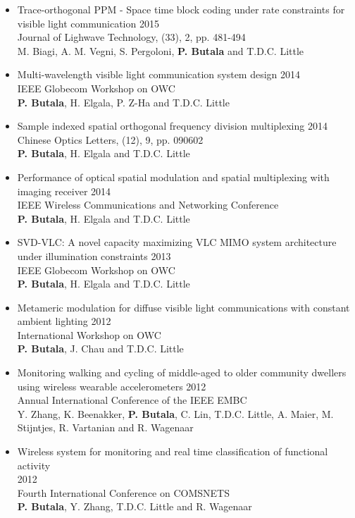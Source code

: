 \begin{itemize}[topsep=0.5em,leftmargin=1.25em]
	\item Trace-orthogonal PPM - Space time block coding under rate constraints for visible light communication \hfill 2015 \\
	Journal of Lighwave Technology, (33), 2, pp. 481-494\\
	M. Biagi, A. M. Vegni, S. Pergoloni, \textbf{P. Butala} and T.D.C. Little
	\item Multi-wavelength visible light communication system design \hfill 2014\\ 
	IEEE Globecom Workshop on OWC\\
	\textbf{P. Butala},  H. Elgala, P. Z-Ha and T.D.C. Little
	\item Sample indexed spatial orthogonal frequency division multiplexing \hfill 2014\\ 
	Chinese Optics Letters, (12), 9, pp. 090602\\
	\textbf{P. Butala}, H. Elgala and T.D.C. Little
	\item Performance of optical spatial modulation and spatial multiplexing with imaging receiver \hfill 2014\\
	IEEE Wireless Communications and Networking Conference\\
	\textbf{P. Butala}, H. Elgala and T.D.C. Little
	\item SVD-VLC: A novel capacity maximizing VLC MIMO system architecture under illumination constraints \hfill 2013\\
	IEEE Globecom Workshop on OWC\\
	\textbf{P. Butala}, H. Elgala and T.D.C. Little
	\item Metameric modulation for diffuse visible light communications with constant ambient lighting \hfill 2012\\
	International Workshop on OWC\\
	\textbf{P. Butala}, J. Chau and T.D.C. Little
	\item Monitoring walking and cycling of middle-aged to older community dwellers using wireless wearable accelerometers \hfill 2012\\
	Annual International Conference of the IEEE EMBC\\
	Y. Zhang, K. Beenakker, \textbf{P. Butala}, C. Lin, T.D.C. Little, A. Maier, M. Stijntjes, R. Vartanian and R. Wagenaar
	\item Wireless system for monitoring and real time classification of functional activity\\ \text{ }\hfill 2012\\
	Fourth International Conference on COMSNETS\\
	\textbf{P. Butala}, Y. Zhang, T.D.C. Little and R. Wagenaar
\end{itemize}
